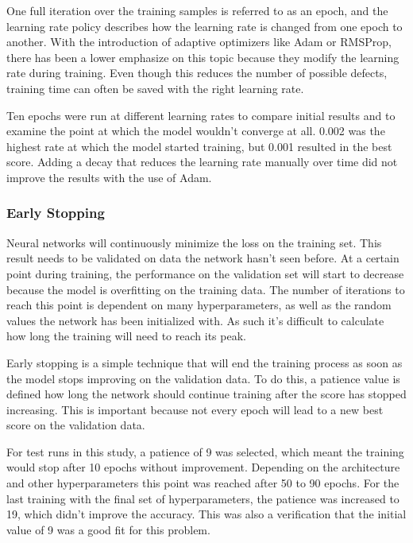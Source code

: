 One full iteration over the training samples is referred to as an epoch, and the learning rate policy describes how the learning rate is changed from one epoch to another. With the introduction of adaptive optimizers like Adam or RMSProp, there has been a lower emphasize on this topic because they modify the learning rate during training. Even though this reduces the number of possible defects, training time can often be saved with the right learning rate.

Ten epochs were run at different learning rates to compare initial results and to examine the point at which the model wouldn't converge at all. 0.002 was the highest rate at which the model started training, but 0.001 resulted in the best score. Adding a decay that reduces the learning rate manually over time did not improve the results with the use of Adam.

\subsubsection{Early Stopping}

Neural networks will continuously minimize the loss on the training set. This result needs to be validated on data the network hasn't seen before. At a certain point during training, the performance on the validation set will start to decrease because the model is overfitting on the training data. The number of iterations to reach this point is dependent on many hyperparameters, as well as the random values the network has been initialized with. As such it's difficult to calculate how long the training will need to reach its peak.

Early stopping is a simple technique that will end the training process as soon as the model stops improving on the validation data. To do this, a patience value is defined how long the network should continue training after the score has stopped increasing. This is important because not every epoch will lead to a new best score on the validation data.

For test runs in this study, a patience of 9 was selected, which meant the training would stop after 10 epochs without improvement. Depending on the architecture and other hyperparameters this point was reached after 50 to 90 epochs. For the last training with the final set of hyperparameters, the patience was increased to 19, which didn't improve the accuracy.  This was also a verification that the initial value of 9 was a good fit for this problem.

